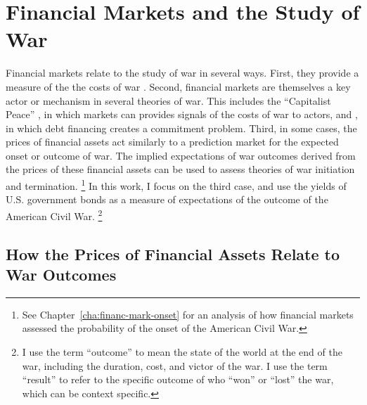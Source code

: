 \section{Financial Markets and the Study of War}
\label{sec:barg-theory-war}

Financial markets relate to the study of war in several ways.
First, they provide a measure of the the costs of war \parencites{SchneiderTroeger2006}{GuidolinLaFerrara2010}.
Second, financial markets are themselves a key actor or mechanism in several theories of war.
This includes the ``Capitalist Peace'' \parencites{Gartzke2007}{DafoeKelsey2014a}, in which markets can provides signals of the costs of war to actors, and \textcite{Slantchev2012a}, in which debt financing creates a commitment problem.
Third, in some cases, the prices of financial assets act similarly to a prediction market for the expected onset or outcome of war.
The implied expectations of war outcomes  derived from the prices of these financial assets can be used to assess theories of war initiation and termination.%
\footnote{See Chapter~\ref{cha:financ-mark-onset} for an analysis of how financial markets assessed the probability of the onset of the American Civil War.}
In this work, I focus on the third case, and use the yields of U.S. government bonds as a measure of expectations of the outcome of the American Civil War.%
\footnote{
  I use the term ``outcome'' to mean the state of the world at the end of the war, including the duration, cost, and victor of the war.
  I use the term ``result'' to refer to the specific outcome of who ``won'' or ``lost'' the war, which can be context specific.
}

\subsection{How the Prices of Financial Assets Relate to War Outcomes}
\label{sec:how-prices-financial}

